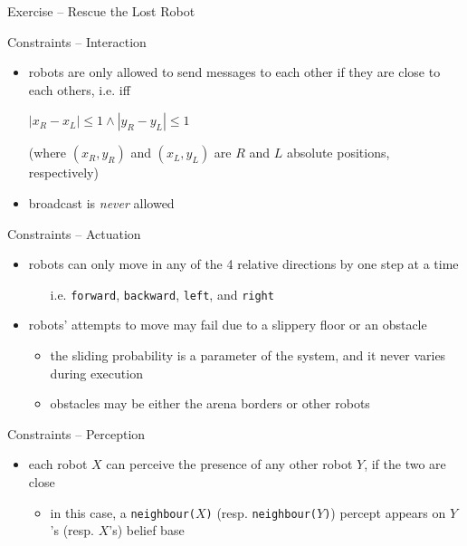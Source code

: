 \documentclass[presentation]{beamer}\mode<presentation>{\usetheme{AMSBolognaFC}}
\begin{document}
\begin{frame}[c, allowframebreaks]{Exercise \currentExercise{} -- Rescue the Lost Robot}
    \begin{exampleblock}{Constraints -- Interaction}
        \begin{itemize}
            \item robots are only allowed to send messages to each other if they are \alert{close} to each others, i.e. iff
            \begin{center}
                $|x_R - x_L| \leq 1 \wedge |y_R - y_L| \leq 1$
            \end{center} 
            (where $(x_R, y_R)$ and $(x_L, y_L)$ are $R$ and $L$ \alert{absolute} positions, respectively)
            
            \item broadcast is \emph{never} allowed
        \end{itemize}
    \end{exampleblock}

    \begin{exampleblock}{Constraints -- Actuation}
        \begin{itemize}
            \item robots can only \alert{move} in any of the \alert{4 relative directions} by one step at a time
            \begin{itemize}
                \item[i.e.] \texttt{forward}, \texttt{backward}, \texttt{left}, and \texttt{right}
            \end{itemize}
        
            \item robots' attempts to move may fail due to a \alert{slippery floor} or an \alert{obstacle}
            \begin{itemize}
                \item the \alert{sliding probability} is a parameter of the system, and it never varies during execution
                
                \item obstacles may be either the arena borders or other robots
            \end{itemize}
            
        \end{itemize}
    \end{exampleblock}

    \begin{exampleblock}{Constraints -- Perception}
        \begin{itemize}
            \item each robot $X$ can perceive the \alert{presence} of any other robot $Y$, if the two are close
            \begin{itemize}
                \item in this case, a \texttt{neighbour($X$)} (resp. \texttt{neighbour($Y$)}) percept appears on $Y$'s (resp. $X$'s) belief base
            \end{itemize}
        

\end{itemize}
\end{exampleblock}
\end{frame}
\end{document}
